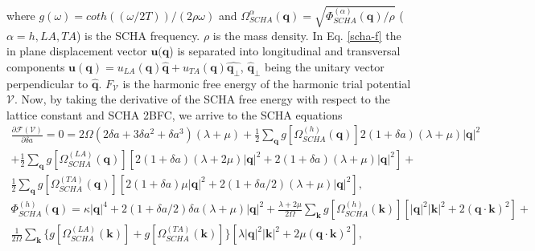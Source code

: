 where $g(\omega)=coth((\omega/2T))/(2\rho\omega)$ and $\Omega_{SCHA}^{\alpha}(\boldsymbol{q})=\sqrt{\Phi_{SCHA}^{(\alpha)}(
\boldsymbol{q})/\rho}$ ($\alpha=h,LA,TA$) is the SCHA frequency. $\rho$ is the mass density. In Eq. \ref{scha-f} the 
in plane displacement vector $\boldsymbol{u}(\boldsymbol{q}$) is separated into longitudinal and transversal 
components $\boldsymbol{u}(\boldsymbol{q})=u_{LA}(\boldsymbol{q})\hat{\boldsymbol{q}}+u_{TA}(\boldsymbol{q})\hat{\boldsymbol{q}_{\perp}}$, $\hat{\boldsymbol{q}}_{\perp}$ being the unitary vector perpendicular to $\hat{\boldsymbol{q}}$. 
$F_{\mathcal{V}}$ is the harmonic free energy of the harmonic trial potential $\mathcal{V}$. Now, by taking the 
derivative of the SCHA free energy with respect to the lattice constant and SCHA 2BFC, we arrive to the SCHA 
equations
\begin{multline}
 \frac{\partial\mathcal{F}(\mathcal{V})}{\partial\delta a}=0=2\Omega(2\delta a+3\delta a^{2}+\delta a^{3})(\lambda+
\mu)+\frac{1}{2}\sum_{\boldsymbol{q}}g[\Omega_{SCHA}^{(h)}(\boldsymbol{q})]2(1+\delta a)(\lambda+\mu)|\boldsymbol{
 q}|^{2}\\+\frac{1}{2}\sum_{\boldsymbol{q}}g[\Omega_{SCHA}^{(LA)}(\boldsymbol{q})][2(1+\delta a)(\lambda+2\mu)|\boldsymbol{q}|^{2}+2(1+\delta a)(\lambda+\mu)|\boldsymbol{q}|^{2}]+\\\frac{1}{2}\sum_{\boldsymbol{q}}g[\Omega_{
 SCHA}^{(TA)}(\boldsymbol{q})][2(1+\delta a)\mu|\boldsymbol{q}|^{2}+2(1+\delta a/2)(\lambda+\mu)|\boldsymbol{q}|^{2}],
\end{multline}
\begin{multline}
 \Phi_{SCHA}^{(h)}(\boldsymbol{q})=\kappa|\boldsymbol{q}|^{4}+2(1+\delta a/2)\delta a(\lambda+\mu)|\boldsymbol{q}|^{2}+\frac{\lambda+2\mu}{2\Omega}\sum_{\boldsymbol{k}}g[\Omega_{SCHA}^{(h)}(\boldsymbol{k})][|\boldsymbol{q}|^{2}|\boldsymbol{
 k}|^{2}+2(\boldsymbol{q}\cdot\boldsymbol{k})^{2}]+\\\frac{1}{2\Omega}\sum_{\boldsymbol{k}}\{g[\Omega_{SCHA}^{(LA)}(\boldsymbol{k})]+g[\Omega_{SCHA}^{(TA)}(\boldsymbol{k})]\}[\lambda|\boldsymbol{q}|^{2}|\boldsymbol{k}|^{2}+2\mu(
 \boldsymbol{q}\cdot\boldsymbol{k})^{2}],
\end{multline}
